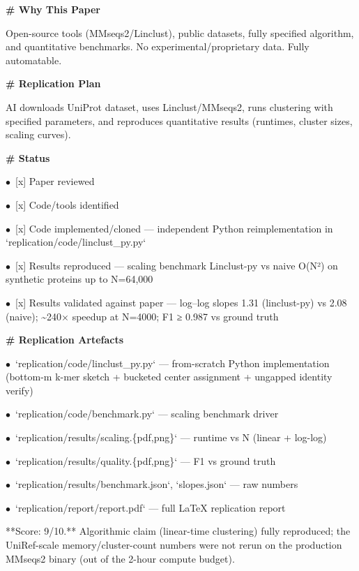 \documentclass[11pt]{article}
\begin{document}
\par\medskip\textbf{\# Why This Paper}\par
Open-source tools (MMseqs2/Linclust), public datasets, fully specified algorithm, and quantitative benchmarks. No experimental/proprietary data. Fully automatable.

\par\medskip\textbf{\# Replication Plan}\par
AI downloads UniProt dataset, uses Linclust/MMseqs2, runs clustering with specified parameters, and reproduces quantitative results (runtimes, cluster sizes, scaling curves).

\par\medskip\textbf{\# Status}\par
\par$\bullet$\ [x] Paper reviewed
\par$\bullet$\ [x] Code/tools identified
\par$\bullet$\ [x] Code implemented/cloned — independent Python reimplementation in `replication/code/linclust\_py.py`
\par$\bullet$\ [x] Results reproduced — scaling benchmark Linclust-py vs naive O(N²) on synthetic proteins up to N=64,000
\par$\bullet$\ [x] Results validated against paper — log–log slopes 1.31 (linclust-py) vs 2.08 (naive); \textasciitilde{}240× speedup at N=4000; F1 ≥ 0.987 vs ground truth

\par\medskip\textbf{\# Replication Artefacts}\par
\par$\bullet$\ `replication/code/linclust\_py.py` — from-scratch Python implementation (bottom-m k-mer sketch + bucketed center assignment + ungapped identity verify)
\par$\bullet$\ `replication/code/benchmark.py` — scaling benchmark driver
\par$\bullet$\ `replication/results/scaling.\{pdf,png\}` — runtime vs N (linear + log-log)
\par$\bullet$\ `replication/results/quality.\{pdf,png\}` — F1 vs ground truth
\par$\bullet$\ `replication/results/benchmark.json`, `slopes.json` — raw numbers
\par$\bullet$\ `replication/report/report.pdf` — full LaTeX replication report

**Score: 9/10.** Algorithmic claim (linear-time clustering) fully reproduced; the UniRef-scale memory/cluster-count numbers were not rerun on the production MMseqs2 binary (out of the 2-hour compute budget).
\normalsize
\end{document}
